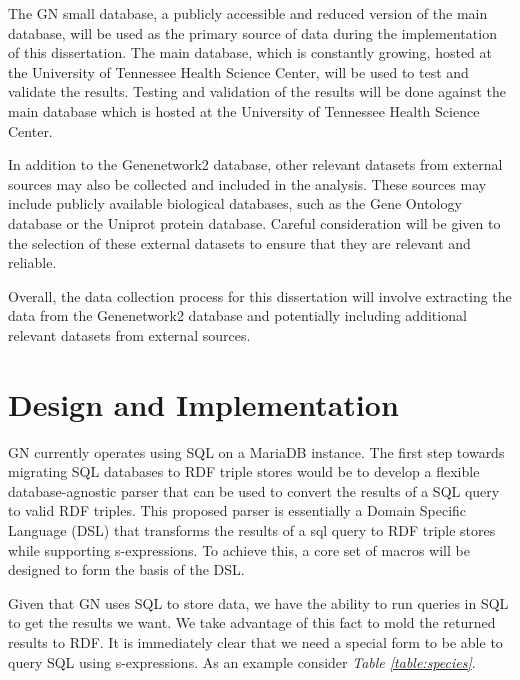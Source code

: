 The GN small database, a publicly accessible and reduced version of the main database, will be used as the primary source of data during the implementation of this dissertation.  The main database, which is constantly growing, hosted at the University of Tennessee Health Science Center, will be used to test and validate the results.  Testing and validation of the results will be done against the main database which is hosted at the University of Tennessee Health Science Center.

In addition to the Genenetwork2 database, other relevant datasets from external sources may also be collected and included in the analysis.  These sources may include publicly available biological databases, such as the Gene Ontology database or the Uniprot protein database.  Careful consideration will be given to the selection of these external datasets to ensure that they are relevant and reliable.

Overall, the data collection process for this dissertation will involve extracting the data from the Genenetwork2 database and potentially including additional relevant datasets from external sources.

\section{Design and Implementation}

GN currently operates using SQL on a MariaDB instance.  The first step towards migrating SQL databases to RDF triple stores would be to develop a flexible database-agnostic parser that can be used to convert the results of a SQL query to valid RDF triples.  This proposed parser is essentially a Domain Specific Language (DSL) that transforms the results of a sql query to RDF triple stores while supporting s-expressions.  To achieve this, a core set of macros will be designed to form the basis of the DSL.

Given that GN uses SQL to store data, we have the ability to run queries in SQL to get the results we want.  We take advantage of this fact to mold the returned results to RDF.  It is immediately clear that we need a special form to be able to query SQL using s-expressions.  As an example consider \textit{Table \ref{table:species}}.

